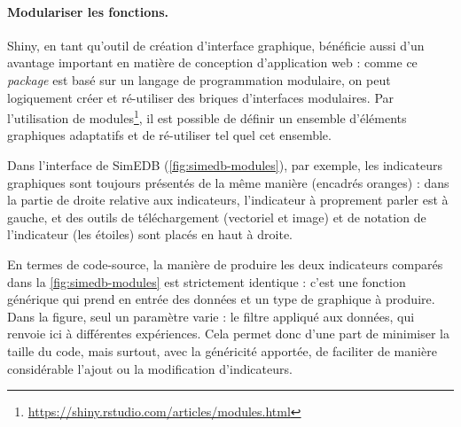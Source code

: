 \paragraph{Modulariser les fonctions.}

\textsf{Shiny}, en tant qu'outil de création d'interface graphique, bénéficie aussi d'un avantage important en matière de conception d'application web : comme ce \textit{package} est basé sur un langage de programmation modulaire, on peut logiquement créer et ré-utiliser des \og briques d'interfaces\fg{} modulaires.
Par l'utilisation de modules\footnote{\href{https://shiny.rstudio.com/articles/modules.html}{https://shiny.rstudio.com/articles/modules.html}}, il est possible de définir un ensemble d'éléments graphiques adaptatifs et de ré-utiliser tel quel cet ensemble.

Dans l'interface de SimEDB (\cref{fig:simedb-modules}), par exemple, les indicateurs graphiques sont toujours présentés de la même manière (encadrés oranges) : dans la partie de droite relative aux indicateurs, l'indicateur à proprement parler est à gauche, et des outils de téléchargement (vectoriel et image) et de notation de l'indicateur (les étoiles) sont placés en haut à droite.

En termes de code-source, la manière de produire les deux indicateurs comparés dans la \cref{fig:simedb-modules} est strictement identique : c'est une fonction générique qui prend en entrée des données et un type de graphique à produire.
Dans la figure, seul un paramètre varie : le filtre appliqué aux données, qui renvoie ici à différentes expériences.
Cela permet donc d'une part de minimiser la taille du code, mais surtout, avec la généricité apportée, de faciliter de manière considérable l'ajout ou la modification d'indicateurs.

